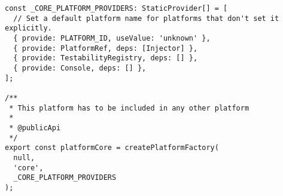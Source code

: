 \begin{verbatim}
const _CORE_PLATFORM_PROVIDERS: StaticProvider[] = [
  // Set a default platform name for platforms that don't set it explicitly.
  { provide: PLATFORM_ID, useValue: 'unknown' },
  { provide: PlatformRef, deps: [Injector] },
  { provide: TestabilityRegistry, deps: [] },
  { provide: Console, deps: [] },
];

/**
 * This platform has to be included in any other platform
 *
 * @publicApi
 */
export const platformCore = createPlatformFactory(
  null,
  'core',
  _CORE_PLATFORM_PROVIDERS
);
\end{verbatim}
